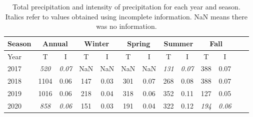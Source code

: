 \begin{table}[t]
  \begin{center}
    \begin{tabular}{|l|*{11}{c|}r|}
      \hline
      Season    &       \multicolumn{2}{|c|}{Annual}          & \multicolumn{2}{|c|}{Winter}& \multicolumn{2}{|c|}{Spring}  & \multicolumn{2}{|c|}{Summer} &\multicolumn{2}{|c|}{Fall}  \\
      \hline
      Year      & T & I  & T & I  & T & I  & T & I  & T & I \\
      \hline
      2017      & \textit{520}  & \textit{0.07}  & NaN & NaN & NaN & NaN & \textit{131}  & \textit{0.07}  & 388  & 0.07  \\
      2018      & 1104           & 0.06  & 147 & 0.03 & 301 & 0.07 & 268  & 0.08  & 388 & 0.07  \\
      2019      & 1016           & 0.06  & 218  & 0.04 & 318 & 0.06 & 352 & 0.11  & 127 &  0.05 \\
      2020      & \textit{858}           & \textit{0.06}   & 151  & 0.03 & 191  & 0.04 & 322  & 0.12 & \textit{194} & \textit{0.06}\\
      \hline
    \end{tabular}
  \end{center}
  \caption[Summary of total precipitation and
    intensity]{\label{secondtable}Total precipitation and intensity of
    precipitation for each year and season. Italics refer to values
    obtained using incomplete information. NaN means there was no
    information.}
\end{table}
